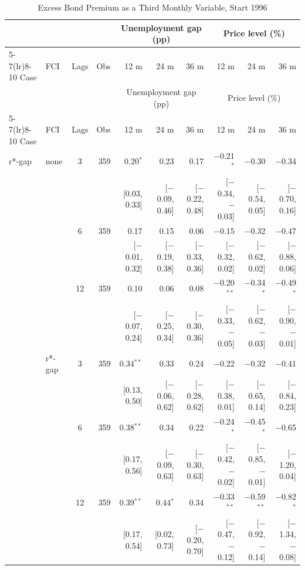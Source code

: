 \begingroup\scriptsize\setlength{\tabcolsep}{0.9pt}
\begin{longtable}{llcrrrrrrr}
\caption{Excess Bond Premium as a Third Monthly Variable, Start 1996}\label{tab:appR3a}\\
\toprule
 & & & & \multicolumn{3}{c}{Unemployment gap (pp)} & \multicolumn{3}{c}{Price level (\%)}\\ \cmidrule(lr){5-7}\cmidrule(lr){8-10}
Case & FCI & Lags & Obs & 12 m & 24 m & 36 m & 12 m & 24 m & 36 m\\
\midrule\endfirsthead
\toprule
 & & & & \multicolumn{3}{c}{Unemployment gap (pp)} & \multicolumn{3}{c}{Price level (\%)}\\ \cmidrule(lr){5-7}\cmidrule(lr){8-10}
Case & FCI & Lags & Obs & 12 m & 24 m & 36 m & 12 m & 24 m & 36 m\\
\midrule\endhead
\bottomrule\endfoot
r*-gap & none & 3 & 359 & 0.20$^{*}$ & 0.23 & 0.17 & $-$0.21$^{*}$ & $-$0.30 & $-$0.34\\
 & & & & {\scriptsize [0.03, 0.33]} & {\scriptsize [$-$0.09, 0.46]} & {\scriptsize [$-$0.22, 0.48]} & {\scriptsize [$-$0.34, $-$0.03]} & {\scriptsize [$-$0.54, 0.05]} & {\scriptsize [$-$0.70, 0.16]}\\
 &  & 6 & 359 & 0.17 & 0.15 & 0.06 & $-$0.15 & $-$0.32 & $-$0.47\\
 & & & & {\scriptsize [$-$0.01, 0.32]} & {\scriptsize [$-$0.19, 0.38]} & {\scriptsize [$-$0.33, 0.36]} & {\scriptsize [$-$0.32, 0.02]} & {\scriptsize [$-$0.62, 0.02]} & {\scriptsize [$-$0.88, 0.06]}\\
 &  & 12 & 359 & 0.10 & 0.06 & 0.08 & $-$0.20$^{**}$ & $-$0.34$^{*}$ & $-$0.49$^{*}$\\
 & & & & {\scriptsize [$-$0.07, 0.24]} & {\scriptsize [$-$0.25, 0.34]} & {\scriptsize [$-$0.30, 0.36]} & {\scriptsize [$-$0.33, $-$0.05]} & {\scriptsize [$-$0.62, $-$0.03]} & {\scriptsize [$-$0.90, $-$0.01]}\\
 & r*-gap & 3 & 359 & 0.34$^{**}$ & 0.33 & 0.24 & $-$0.22 & $-$0.32 & $-$0.41\\
 & & & & {\scriptsize [0.13, 0.50]} & {\scriptsize [$-$0.06, 0.62]} & {\scriptsize [$-$0.28, 0.62]} & {\scriptsize [$-$0.38, 0.01]} & {\scriptsize [$-$0.65, 0.14]} & {\scriptsize [$-$0.84, 0.23]}\\
 &  & 6 & 359 & 0.38$^{**}$ & 0.34 & 0.22 & $-$0.24$^{*}$ & $-$0.45$^{*}$ & $-$0.65\\
 & & & & {\scriptsize [0.17, 0.56]} & {\scriptsize [$-$0.09, 0.63]} & {\scriptsize [$-$0.30, 0.63]} & {\scriptsize [$-$0.42, $-$0.02]} & {\scriptsize [$-$0.85, $-$0.01]} & {\scriptsize [$-$1.20, 0.04]}\\
 &  & 12 & 359 & 0.39$^{**}$ & 0.44$^{*}$ & 0.34 & $-$0.33$^{**}$ & $-$0.59$^{**}$ & $-$0.82$^{*}$\\
 & & & & {\scriptsize [0.17, 0.54]} & {\scriptsize [0.02, 0.73]} & {\scriptsize [$-$0.20, 0.70]} & {\scriptsize [$-$0.47, $-$0.12]} & {\scriptsize [$-$0.92, $-$0.14]} & {\scriptsize [$-$1.34, $-$0.08]}\\
\end{longtable}
